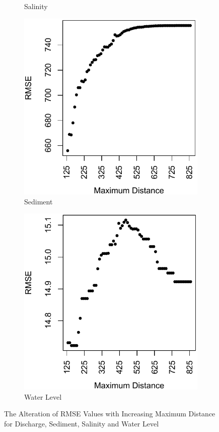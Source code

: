 \documentclass[preprint,review,12pt]{elsarticle}
\begin{document}
\begin{figure}[!ht]
\begin{subfigure}[t]{0.4\textwidth}
\caption{Salinity}
\end{subfigure}
\begin{subfigure}[t]{0.4\textwidth}
\centering
\includegraphics[width=\linewidth, keepaspectratio]{sedmax.pdf}
\caption{Sediment}
\end{subfigure} \hspace{0.1\textwidth} %
\begin{subfigure}[t]{0.4\textwidth}
\centering
\includegraphics[width=\linewidth, keepaspectratio]{wlmax.pdf}
\caption{Water Level}
\end{subfigure}
\caption{The Alteration of RMSE Values with Increasing Maximum Distance for Discharge, Sediment, Salinity and Water Level}
\label{rmsemd}
\vspace*{-0.3cm}
\end{figure}
\end{document}
